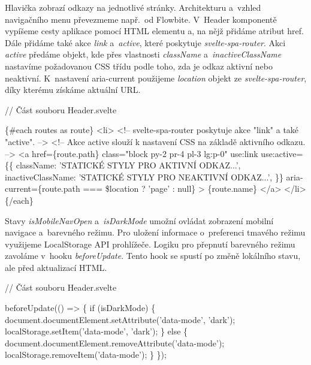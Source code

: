 Hlavička zobrazí odkazy na jednotlivé stránky. Architekturu a~vzhled navigačního menu převezmeme např.~od Flowbite. 
V~Header komponentě vypíšeme cesty aplikace pomocí HTML elementu a, na nějž přidáme atribut href. 
Dále přidáme také akce \emph{link} a~\emph{active}, které poskytuje \emph{svelte-spa-router}. 
Akci \emph{active} předáme objekt, kde přes vlastnosti \emph{className} a~\emph{inactiveClassName} nastavíme požadovanou CSS třídu podle toho, zda je odkaz aktivní nebo neaktivní. 
K~nastavení aria-current použijeme \emph{location} objekt ze \emph{svelte-spa-router}, díky kterému získáme aktuální URL.

\begin{prog}
// Část souboru Header.svelte

\{#each routes as route\}
  <li>
    <!-- svelte-spa-router poskytuje akce "link" a také "active". -->
    <!-- Akce active slouží k nastavení CSS na základě aktivního odkazu. -->
    <a
      href=\{route.path\}
      class="block py-2 pr-4 pl-3 lg:p-0"
      use:link
      use:active=\{\{
        className: 'STATICKÉ STYLY PRO AKTIVNÍ ODKAZ...',
        inactiveClassName: 'STATICKÉ STYLY PRO NEAKTIVNÍ ODKAZ...',
      \}\}
      aria-current=\{route.path === \$location ? 'page' : null\}
    >
      \{route.name\}
    </a>
  </li>
\{/each\}
\end{prog}

Stavy \emph{isMobileNavOpen} a~\emph{isDarkMode} umožní ovládat zobrazení mobilní navigace a~barevného režimu. Pro uložení informace o~preferenci tmavého režimu využijeme LocalStorage API prohlížeče. 
Logiku pro přepnutí barevného režimu zavoláme v~hooku \emph{beforeUpdate}. Tento hook se spustí po změně lokálního stavu, ale před aktualizací HTML.

\begin{prog}
// Část souboru Header.svelte

beforeUpdate(() => \{
  if (isDarkMode) \{
    document.documentElement.setAttribute('data-mode', 'dark');
    localStorage.setItem('data-mode', 'dark');
  \} else \{
    document.documentElement.removeAttribute('data-mode');
    localStorage.removeItem('data-mode');
  \}
\});
\end{prog}